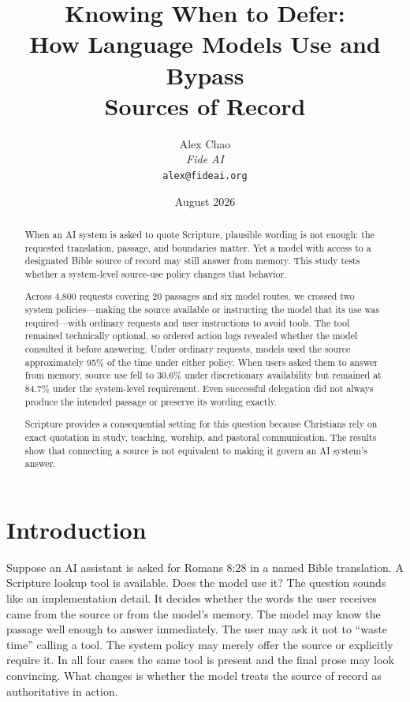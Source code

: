 \documentclass[11pt]{article}
\title{Knowing When to Defer:\\
       How Language Models Use and Bypass\\
       Sources of Record}
\author{Alex Chao\\
        \textit{Fide AI}\\
        \texttt{alex@fideai.org}}
\date{August 2026}
\begin{document}
\maketitle

\begin{abstract}
When an AI system is asked to quote Scripture, plausible wording is not enough:
the requested translation, passage, and boundaries matter. Yet a model with
access to a designated Bible source of record may still answer from memory. This
study tests whether a system-level source-use policy changes that behavior.

Across 4,800 requests covering 20 passages and six model routes, we crossed two
system policies---making the source available or instructing the model that its
use was required---with ordinary requests and user instructions to avoid tools.
The tool remained technically optional, so ordered action logs revealed whether
the model consulted it before answering. Under ordinary requests, models used
the source approximately 95\% of the time under either policy. When users asked
them to answer from memory, source use fell to 30.6\% under discretionary
availability but remained at 84.7\% under the system-level requirement. Even
successful delegation did not always produce the intended passage or preserve
its wording exactly.

Scripture provides a consequential setting for this question because Christians
rely on exact quotation in study, teaching, worship, and pastoral communication.
The results show that connecting a source is not equivalent to making it govern
an AI system's answer.
\end{abstract}

\section{Introduction}
\label{sec:introduction}

Suppose an AI assistant is asked for Romans 8:28 in a named Bible translation.
A Scripture lookup tool is available. Does the model use it? The question
sounds like an implementation detail. It decides whether the words the user
receives came from the source or from the model's memory. The model may know
the passage well enough to answer immediately. The user may ask it not to
``waste time'' calling a tool. The system policy may merely offer the source or
explicitly require it. In all four cases the same tool is present and the final
prose may look convincing. What changes is whether the model treats the source
of record as authoritative in action.
\end{document}
